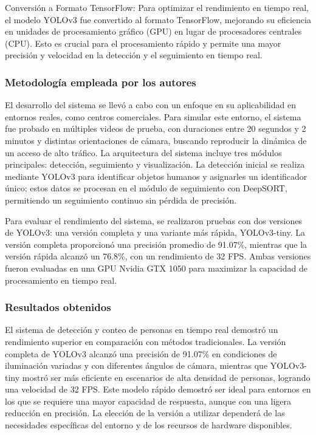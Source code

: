 Conversión a Formato TensorFlow: Para optimizar el rendimiento en tiempo real, el modelo YOLOv3 fue convertido al formato TensorFlow, mejorando su eficiencia en unidades de procesamiento gráfico (GPU) en lugar de procesadores centrales (CPU). Esto es crucial para el procesamiento rápido y permite una mayor precisión y velocidad en la detección y el seguimiento en tiempo real.




\subsubsection{Metodología empleada por los autores}
El desarrollo del sistema se llevó a cabo con un enfoque en su aplicabilidad en entornos reales, como centros comerciales. Para simular este entorno, el sistema fue probado en múltiples videos de prueba, con duraciones entre 20 segundos y 2 minutos y distintas orientaciones de cámara, buscando reproducir la dinámica de un acceso de alto tráfico. La arquitectura del sistema incluye tres módulos principales: detección, seguimiento y visualización. La detección inicial se realiza mediante YOLOv3 para identificar objetos humanos y asignarles un identificador único; estos datos se procesan en el módulo de seguimiento con DeepSORT, permitiendo un seguimiento continuo sin pérdida de precisión.

Para evaluar el rendimiento del sistema, se realizaron pruebas con dos versiones de YOLOv3: una versión completa y una variante más rápida, YOLOv3-tiny. La versión completa proporcionó una precisión promedio de 91.07\%, mientras que la versión rápida alcanzó un 76.8\%, con un rendimiento de 32 FPS. Ambas versiones fueron evaluadas en una GPU Nvidia GTX 1050 para maximizar la capacidad de procesamiento en tiempo real.





\subsubsection{Resultados obtenidos}
El sistema de detección y conteo de personas en tiempo real demostró un rendimiento superior en comparación con métodos tradicionales. La versión completa de YOLOv3 alcanzó una precisión de 91.07\% en condiciones de iluminación variadas y con diferentes ángulos de cámara, mientras que YOLOv3-tiny mostró ser más eficiente en escenarios de alta densidad de personas, logrando una velocidad de 32 FPS. Este modelo rápido demostró ser ideal para entornos en los que se requiere una mayor capacidad de respuesta, aunque con una ligera reducción en precisión. La elección de la versión a utilizar dependerá de las necesidades específicas del entorno y de los recursos de hardware disponibles.


